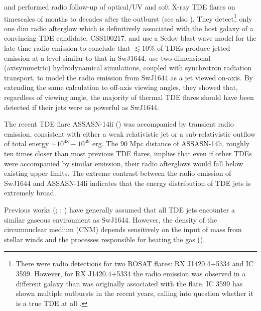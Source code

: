 \documentclass[usenatbib,fleqn]{mnras}
\begin{document}
\citet{Bower+2013} and \citet{van-Velzen+2013} performed radio
follow-up of optical/UV and soft X-ray TDE flares on timescales of
months to decades after the outburst (see also
\citealt{Arcavi+2014}). They detect\footnote{There were radio
  detections for two ROSAT flares: RX J1420.4+5334 and IC
  3599. However, for RX J1420.4+5334 the radio emission was observed
  in a different galaxy than was originally associated with the flare.
  IC 3599 has shown multiple outbursts in the recent years, calling
  into question whether it is a true TDE at all \citep{Campana+2015}.}
only one dim radio afterglow which is definitively associated with the
host galaxy of a convincing TDE candidate, CSS100217.
\citet{Bower+2013} and \citet{van-Velzen+2013} use a Sedov blast wave
model for the late-time radio emission to conclude that $\lesssim
10\%$ of TDEs produce jetted emission at a level similar to that in
SwJ1644.  \citet{Mimica+2015} use two-dimensional (axisymmetric)
hydrodynamical simulations, coupled with synchrotron radiation
transport, to model the radio emission from SwJ1644 as a jet viewed
on-axis.  By extending the same calculation to off-axis viewing
angles, they showed that, regardless of viewing angle, the majority of
thermal TDE flares should have been detected if their jets were as
powerful as SwJ1644.

The recent TDE flare ASSASN-14li (\citealt{Holoien+2016a}) was
accompanied by transient radio emission, consistent with either a weak
relativistic jet \citep{van-Velzen+2015} or a sub-relativistic outflow
\citep{Alexander+2015,Krolik+16} of total energy $\sim
10^{48}-10^{49}$ erg.  The 90 Mpc distance of ASSASN-14li, roughly ten
times closer than most previous TDE flares, implies that even if other
TDEs were accompanied by similar emission, their radio afterglows
would fall below existing upper limits.  The extreme contrast between
the radio emission of SwJ1644 and ASSASN-14li indicates that the
energy distribution of TDE jets is extremely broad.

Previous works (\citealt{Bower+2013}; \citealt{van-Velzen+2013};
\citealt{Mimica+2015}) have generally assumed that all TDE jets
encounter a similar gaseous environment as SwJ1644.  However, the
density of the circumnuclear medium (CNM) depends sensitively on the
input of mass from stellar winds and the processes responsible for
heating the gas (\citealt{Quataert2004,Generozov+2015}). 
\end{document}

